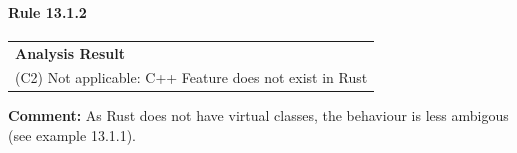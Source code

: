\paragraph{Rule 13.1.2}
\begin{longtable}{p{13cm}}
\textbf{Analysis Result} \\
(C2) Not applicable: C++ Feature does not exist in Rust \\
\end{longtable}
\textbf{Comment:} As Rust does not have virtual classes, the behaviour is less ambigous (see example 13.1.1). \\
